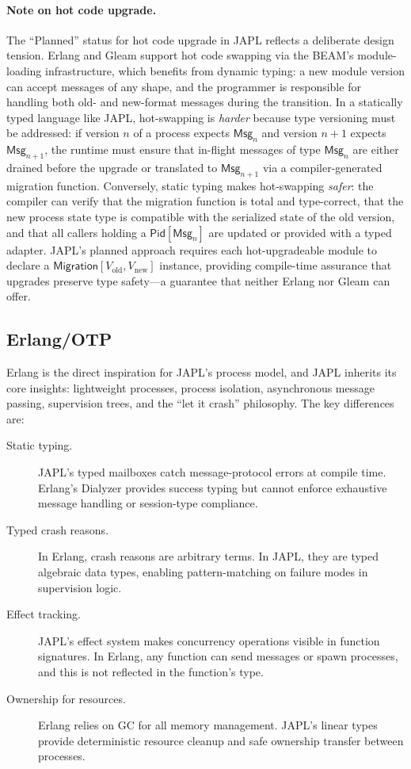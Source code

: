 \documentclass[11pt,a4paper]{article}
\newcommand{\Pid}{\mathsf{Pid}}
\begin{document}
\paragraph{Note on hot code upgrade.} The ``Planned'' status for hot code upgrade in JAPL reflects a deliberate design tension. Erlang and Gleam support hot code swapping via the BEAM's module-loading infrastructure, which benefits from dynamic typing: a new module version can accept messages of any shape, and the programmer is responsible for handling both old- and new-format messages during the transition. In a statically typed language like JAPL, hot-swapping is \emph{harder} because type versioning must be addressed: if version $n$ of a process expects $\mathsf{Msg}_n$ and version $n{+}1$ expects $\mathsf{Msg}_{n+1}$, the runtime must ensure that in-flight messages of type $\mathsf{Msg}_n$ are either drained before the upgrade or translated to $\mathsf{Msg}_{n+1}$ via a compiler-generated migration function. Conversely, static typing makes hot-swapping \emph{safer}: the compiler can verify that the migration function is total and type-correct, that the new process state type is compatible with the serialized state of the old version, and that all callers holding a $\Pid[\mathsf{Msg}_n]$ are updated or provided with a typed adapter. JAPL's planned approach requires each hot-upgradeable module to declare a $\mathsf{Migration}[V_{\text{old}}, V_{\text{new}}]$ instance, providing compile-time assurance that upgrades preserve type safety---a guarantee that neither Erlang nor Gleam can offer.

\subsection{Erlang/OTP}

Erlang is the direct inspiration for JAPL's process model, and JAPL inherits its core insights: lightweight processes, process isolation, asynchronous message passing, supervision trees, and the ``let it crash'' philosophy. The key differences are:

\begin{description}
\item[Static typing.] JAPL's typed mailboxes catch message-protocol errors at compile time. Erlang's Dialyzer provides success typing but cannot enforce exhaustive message handling or session-type compliance.

\item[Typed crash reasons.] In Erlang, crash reasons are arbitrary terms. In JAPL, they are typed algebraic data types, enabling pattern-matching on failure modes in supervision logic.

\item[Effect tracking.] JAPL's effect system makes concurrency operations visible in function signatures. In Erlang, any function can send messages or spawn processes, and this is not reflected in the function's type.

\item[Ownership for resources.] Erlang relies on GC for all memory management. JAPL's linear types provide deterministic resource cleanup and safe ownership transfer between processes.
\end{description}
\end{document}
